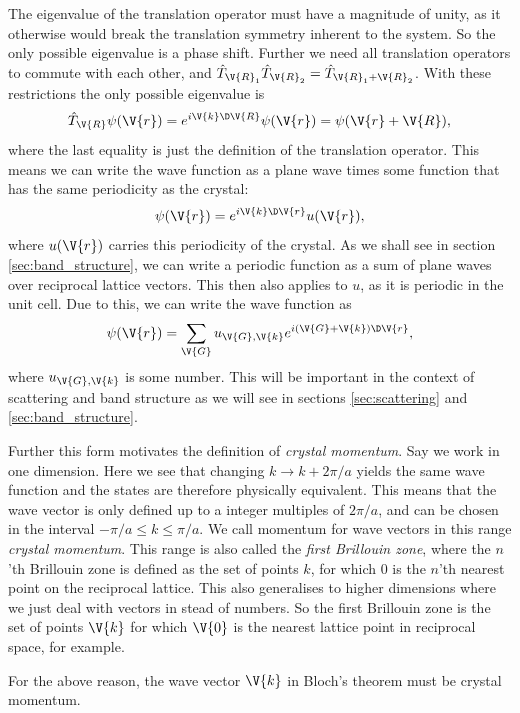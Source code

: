 \documentclass[main.tex]{subfiles}
\begin{document}
	The eigenvalue of the translation operator must have a magnitude of unity, as it otherwise would break the translation symmetry inherent to the system. So the only possible eigenvalue is a phase shift. Further we need all translation operators to commute with each other, and $ \hat{T}_{\V{R}_1} \hat{T}_{\V{R}_2} = \hat{T}_{\V{R}_1 + \V{R}_2} $. With these restrictions the only possible eigenvalue is
	\begin{equation}
		\hat{T}_{\V{R}} \psi(\V{r}) = e^{i\V{k} \D\V{R}} \psi(\V{r}) = \psi(\V{r}+\V{R}),
	\end{equation}
	where the last equality is just the definition of the translation operator. This means we can write the wave function as a plane wave times some function that has the same periodicity as the crystal:
	\begin{equation}
		\psi(\V{r}) = e^{i\V{k} \D \V{r}} u(\V{r}),
	\end{equation}
	where $ u(\V{r}) $ carries this periodicity of the crystal. As we shall see in section \ref{sec:band_structure}, we can write a periodic function as a sum of plane waves over reciprocal lattice vectors. This then also applies to $ u $, as it is periodic in the unit cell. Due to this, we can write the wave function as
	\begin{equation}
		\psi(\V{r}) = \sum_{\V{G}} u_{\V{G},\V{k}} e^{i(\V{G} + \V{k}) \D \V{r}},
	\end{equation}
	where $ u_{\V{G},\V{k}} $ is some number. This will be important in the context of scattering and band structure as we will see in sections \ref{sec:scattering} and \ref{sec:band_structure}.
	
	Further this form motivates the definition of \textit{crystal momentum}. Say we work in one dimension. Here we see that changing $ k \to k + 2\pi/a $ yields the same wave function and the states are therefore physically equivalent. This means that the wave vector is only defined up to a integer multiples of $ 2 \pi / a $, and can be chosen in the interval $ -\pi /a \leq k \leq \pi/a $. We call momentum for wave vectors in this range \textit{crystal momentum}. This range is also called the \textit{first Brillouin zone}, where the $ n $'th Brillouin zone is defined as the set of points $ k $, for which $ 0 $ is the $ n $'th nearest point on the reciprocal lattice. This also generalises to higher dimensions where we just deal with vectors in stead of numbers. So the first Brillouin zone is the set of points $ \V{k} $ for which $ \V{0} $ is the nearest lattice point in reciprocal space, for example.
	
	For the above reason, the wave vector $ \V{k} $ in Bloch's theorem must be crystal momentum.
	
	
	
\end{document}
